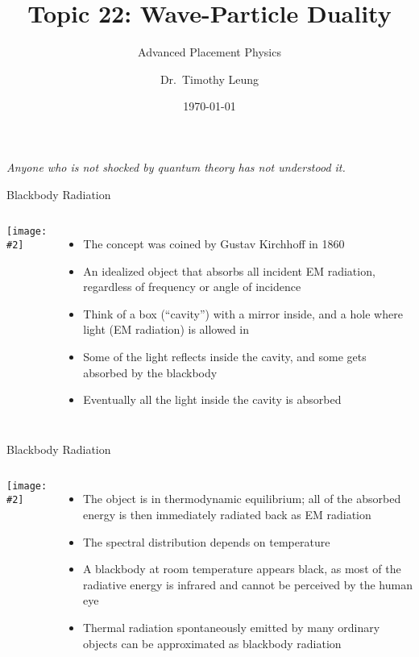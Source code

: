 \documentclass[12pt,compress,aspectratio=169]{beamer}
\title[Quantum]{Topic 22: Wave-Particle Duality}
\subtitle{Advanced Placement Physics}
\author[TML]{Dr.\ Timothy Leung}
\institute{Olympiads School\\Toronto, Ontario, Canada}
\date{\today}
\newcommand{\pic}[2]{\texttt{[image: \#2]}}
\begin{document}
\begin{frame}
  \maketitle
\end{frame}


\begin{frame}{}
  \begin{center}
    \emph{Anyone who is not shocked by quantum theory has not understood it.}

    \vspace{.2in}
    \hspace{4in}{- Niels Bohr}
  \end{center}
\end{frame}



\begin{frame}{Blackbody Radiation}
  \begin{columns}
    \pic{1.3}{Black-body_realization}
     
    \begin{itemize}
    \item The concept was coined by Gustav Kirchhoff in 1860
    \item An idealized object that absorbs all incident EM radiation,
      regardless of frequency or angle of incidence
    \item Think of a box (``cavity'') with a mirror inside, and a hole where
      light (EM radiation) is allowed in
    \item Some of the light reflects inside the cavity, and some gets absorbed
      by the blackbody
    \item Eventually all the light inside the cavity is absorbed
    \end{itemize}
    \end{columns}
\end{frame}


\begin{frame}{Blackbody Radiation}
  \begin{columns}
    \pic{1.3}{Black-body_realization}
    
    \begin{itemize}
    \item The object is in thermodynamic equilibrium; all of the absorbed
      energy is then immediately radiated back as EM radiation
    \item The spectral distribution depends on temperature
    \item A blackbody at room temperature appears black, as most of the
      radiative energy is infrared and cannot be perceived by the human eye
    \item Thermal radiation spontaneously emitted by many ordinary objects can
      be approximated as blackbody radiation 
    \end{itemize}
  \end{columns}
\end{frame}
\end{document}
